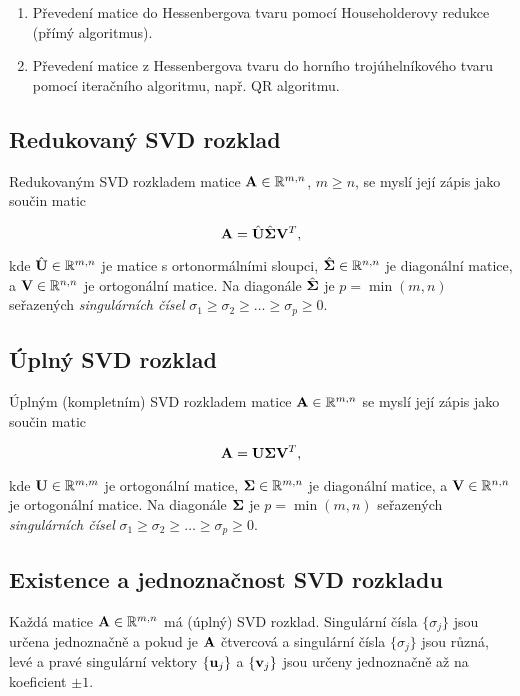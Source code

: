 \begin{enumerate}
	\item Převedení matice do Hessenbergova tvaru pomocí Householderovy redukce (přímý algoritmus).
	\item Převedení matice z Hessenbergova tvaru do horního trojúhelníkového tvaru pomocí iteračního algoritmu, např. QR algoritmu.
\end{enumerate}

\subsection*{Redukovaný SVD rozklad}

Redukovaným SVD rozkladem matice $\mathbf{A}\in\mathbb{R}^{m,n}$, $m \ge n$, se myslí její zápis jako součin matic

\[ \mathbf{A} = \hat{\mathbf{U}} \hat{\mathbf{\Sigma}} \mathbf{V}^T, \]

\noindent kde $\hat{\mathbf{U}} \in \mathbb{R}^{m,n}$ je matice s ortonormálními sloupci, $\hat{\mathbf{\Sigma}} \in \mathbb{R}^{n,n}$ je diagonální matice, a $\mathbf{V} \in \mathbb{R}^{n,n}$ je ortogonální matice.
Na diagonále $\hat{\mathbf{\Sigma}}$ je $p = \min(m,n)$ seřazených \emph{singulárních čísel} $\sigma_1 \ge \sigma_2 \ge \dots \ge \sigma_p \ge 0$.

\subsection*{Úplný SVD rozklad}

Úplným (kompletním) SVD rozkladem matice $\mathbf{A}\in\mathbb{R}^{m,n}$ se myslí její zápis jako součin matic

\[ \mathbf{A} = \mathbf{U} \mathbf{\Sigma} \mathbf{V}^T, \]

\noindent kde $\mathbf{U} \in \mathbb{R}^{m,m}$ je ortogonální matice, $\mathbf{\Sigma} \in \mathbb{R}^{m,n}$ je diagonální matice, a $\mathbf{V} \in \mathbb{R}^{n,n}$ je ortogonální matice.
Na diagonále $\mathbf{\Sigma}$ je $p = \min(m,n)$ seřazených \emph{singulárních čísel} $\sigma_1 \ge \sigma_2 \ge \dots \ge \sigma_p \ge 0$.

\subsection*{Existence a jednoznačnost SVD rozkladu}

Každá matice $\mathbf{A} \in \mathbb{R}^{m,n}$ má (úplný) SVD rozklad. Singulární čísla $\{\sigma_j\}$ jsou určena jednoznačně a pokud je $\mathbf{A}$ čtvercová a singulární čísla $\{\sigma_j\}$ jsou různá, levé a pravé singulární vektory $\{\mathbf{u}_j\}$ a $\{\mathbf{v}_j\}$ jsou určeny jednoznačně až na koeficient $\pm 1$.

